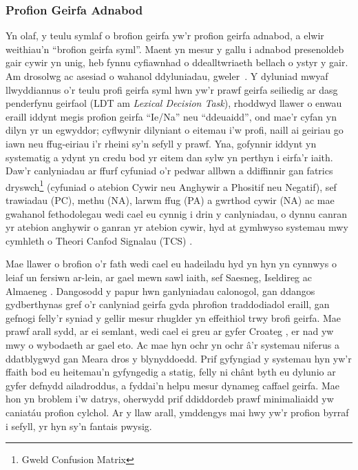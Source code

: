 \subsubsection{Profion Geirfa Adnabod}
Yn olaf, y teulu symlaf o brofion geirfa yw'r profion geirfa adnabod, a elwir weithiau'n ``brofion geirfa syml''. Maent yn mesur y gallu i adnabod presenoldeb gair cywir yn unig, heb fynnu cyfiawnhad o ddealltwriaeth bellach o ystyr y gair. Am drosolwg ac asesiad o wahanol ddyluniadau, gweler~\cite{meara_complexities_1994}. Y dyluniad mwyaf llwyddiannus o'r teulu profi geirfa syml hwn yw'r prawf geirfa seiliedig ar dasg penderfynu geirfaol (LDT am \textit{Lexical Decision Task}), rhoddwyd llawer o enwau eraill iddynt megis profion geirfa ``Ie/Na'' neu ``ddeuaidd'', ond mae'r cyfan yn dilyn yr un egwyddor; cyflwynir dilyniant o eitemau i'w profi, naill ai geiriau go iawn neu ffug-eiriau \parencite{meara_imaginary_2012} i'r rheini sy'n sefyll y prawf. Yna, gofynnir iddynt yn systematig a ydynt yn credu bod yr eitem dan sylw yn perthyn i eirfa'r iaith. Daw'r canlyniadau ar ffurf cyfuniad o'r pedwar allbwn a ddiffinnir gan fatrics dryswch\footnote{Gweld Confusion Matrix} (cyfuniad o atebion Cywir neu Anghywir a Phositif neu Negatif), sef trawiadau (PC), methu (NA), larwm ffug (PA) a gwrthod cywir (NA) ac mae gwahanol fethodolegau wedi cael eu cynnig i drin y canlyniadau, o dynnu canran yr atebion anghywir o ganran yr atebion cywir, hyd at gymhwyso systemau mwy cymhleth o Theori Canfod Signalau (TCS) \parencite{huibregtse_scores_2002}.

Mae llawer o brofion o'r fath wedi cael eu hadeiladu hyd yn hyn yn cynnwys o leiaf un fersiwn ar-lein, ar gael mewn sawl iaith, sef Saesneg, Iseldireg ac Almaeneg \parencite{lemhofer_introducing_2012}. Dangosodd y papur hwn ganlyniadau calonogol, gan ddangos gydberthynas gref o'r canlyniad geirfa gyda phrofion traddodiadol eraill, gan gefnogi felly'r syniad y gellir mesur rhuglder yn effeithiol trwy brofi geirfa. Mae prawf arall sydd, ar ei semlant, wedi cael ei greu ar gyfer Croateg \parencite{srce_how_2025}, er nad yw mwy o wybodaeth ar gael eto. Ac mae hyn ochr yn ochr â'r systemau niferus a ddatblygwyd gan Meara dros y blynyddoedd\cite{meara_complexities_1994}. Prif gyfyngiad y systemau hyn yw'r ffaith bod eu heitemau'n gyfyngedig a statig, felly ni chânt byth eu dylunio ar gyfer defnydd ailadroddus, a fyddai'n helpu mesur dynameg caffael geirfa. Mae hon yn broblem i'w datrys, oherwydd prif ddiddordeb prawf minimaliaidd yw caniatáu profion cylchol. Ar y llaw arall, ymddengys mai hwy yw'r profion byrraf i sefyll, yr hyn sy'n fantais pwysig.

